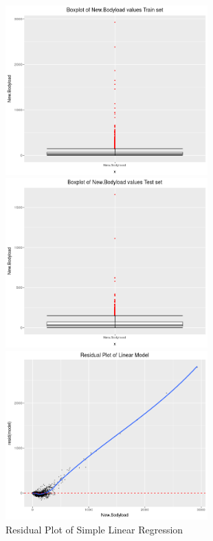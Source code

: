 \begin{figure}[h]
	\centering
	\begin{minipage}{.33\textwidth}
		\centering
		\includegraphics[width=\linewidth, height=6.5cm]{Images/NBLDistributionTrain.png}
		\captionsetup{width=.8\linewidth}
	\end{minipage}%
	\hfill
	\begin{minipage}{.33\textwidth}
		\centering
		\includegraphics[width=\linewidth, height=6.5cm]{Images/NBLDistributionTest.png}
		\captionsetup{width=.8\linewidth}
	\end{minipage} %
	\hfill
	\begin{minipage}{.33\textwidth}
		\centering
		\includegraphics[width=\linewidth, height=6.5cm]{Images/LinearModelResidualWithOutliers.png}
		\caption{Residual Plot of Simple Linear Regression}
	\end{minipage} %
\end{figure} 
